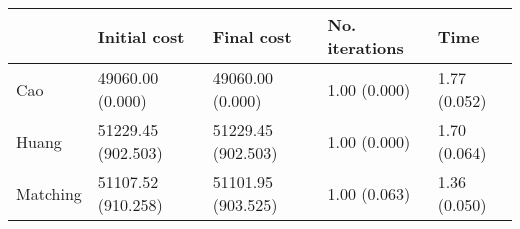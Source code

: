 \begin{tabular}{lllll}
\toprule
{} &        Initial cost &          Final cost & No. iterations &          Time \\
\midrule
Cao      &    49060.00 (0.000) &    49060.00 (0.000) &   1.00 (0.000) &  1.77 (0.052) \\
Huang    &  51229.45 (902.503) &  51229.45 (902.503) &   1.00 (0.000) &  1.70 (0.064) \\
Matching &  51107.52 (910.258) &  51101.95 (903.525) &   1.00 (0.063) &  1.36 (0.050) \\
\bottomrule
\end{tabular}
